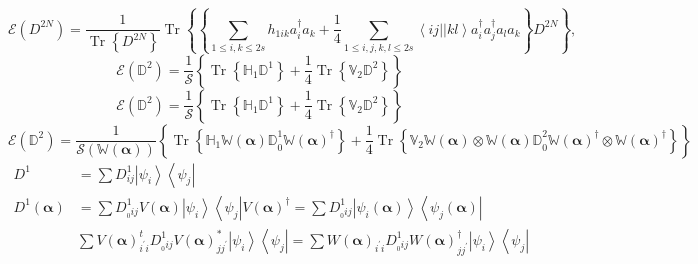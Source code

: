 \documentclass[aps,preprint]{revtex4}%
\begin{document}
\begin{equation}
\mathcal{E}\left(  D^{2N}\right)  =\frac{1}{\operatorname{Tr}\left\{
D^{2N}\right\}  }\operatorname{Tr}\left\{  \left\{  \sum_{1\leq i,k\leq
2s}h_{1ik}a_{i}^{\dagger}a_{k}+\frac{1}{4}\sum_{1\leq i,j,k,l\leq
2s}\left\langle ij||kl\right\rangle a_{i}^{\dagger}a_{j}^{\dagger}a_{l}%
a_{k}\right\}  D^{2N}\right\}  , \label{en1}%
\end{equation}%
\begin{equation}
\mathcal{E}\left(  \mathbb{D}^{2}\right)  =\frac{1}{\mathcal{S}}\left\{
\operatorname{Tr}\left\{  \mathbb{H}_{1}\mathbb{D}^{1}\right\}  +\frac{1}%
{4}\operatorname{Tr}\left\{  \mathbb{V}_{2}\mathbb{D}^{2}\right\}  \right\}
\end{equation}%
\begin{equation}
\mathcal{E}\left(  \mathbb{D}^{2}\right)  =\frac{1}{\mathcal{S}}\left\{
\operatorname{Tr}\left\{  \mathbb{H}_{1}\mathbb{D}^{1}\right\}  +\frac{1}%
{4}\operatorname{Tr}\left\{  \mathbb{V}_{2}\mathbb{D}^{2}\right\}  \right\}
\end{equation}%
\begin{equation}
\mathcal{E}\left(  \mathbb{D}^{2}\right)  =\frac{1}{\mathcal{S}\left(
\mathbb{W\left(  \mathbf{\alpha}\right)  }\right)  }\left\{  \operatorname{Tr}%
\left\{  \mathbb{H}_{1}\mathbb{W\left(  \mathbf{\alpha}\right)  D}_{0}%
^{1}\mathbb{W\left(  \mathbf{\alpha}\right)  }^{\dagger}\right\}  +\frac{1}%
{4}\operatorname{Tr}\left\{  \mathbb{V}_{2}\mathbb{W\left(  \mathbf{\alpha
}\right)  \otimes W\left(  \mathbf{\alpha}\right)  D}_{0}^{2}\mathbb{W\left(
\mathbf{\alpha}\right)  }^{\dagger}\otimes\mathbb{W\left(  \mathbf{\alpha
}\right)  }^{\dagger}\right\}  \right\}
\end{equation}%
\begin{align}
D^{1}  &  =\sum D_{ij}^{1}\left\vert \psi_{i}\right\rangle \left\langle
\psi_{j}\right\vert \\
D^{1}\left(  \mathbf{\alpha}\right)   &  =\sum D_{_{0}ij}^{1}V\left(
\mathbf{\alpha}\right)  \left\vert \psi_{i}\right\rangle \left\langle \psi
_{j}\right\vert V\left(  \mathbf{\alpha}\right)  ^{\dagger}=\sum D_{_{0}%
ij}^{1}\left\vert \psi_{i}\left(  \mathbf{\alpha}\right)  \right\rangle
\left\langle \psi_{j}\left(  \mathbf{\alpha}\right)  \right\vert \\
&  \sum V\left(  \mathbf{\alpha}\right)  _{i^{\prime}i}^{t}D_{_{0}ij}%
^{1}V\left(  \mathbf{\alpha}\right)  _{jj^{\prime}}^{\ast}\left\vert \psi
_{i}\right\rangle \left\langle \psi_{j}\right\vert =\sum W\left(
\mathbf{\alpha}\right)  _{i^{\prime}i}D_{_{0}ij}^{1}W\left(  \mathbf{\alpha
}\right)  _{jj^{\prime}}^{\dagger}\left\vert \psi_{i}\right\rangle
\left\langle \psi_{j}\right\vert
\end{align}%
\end{document}

